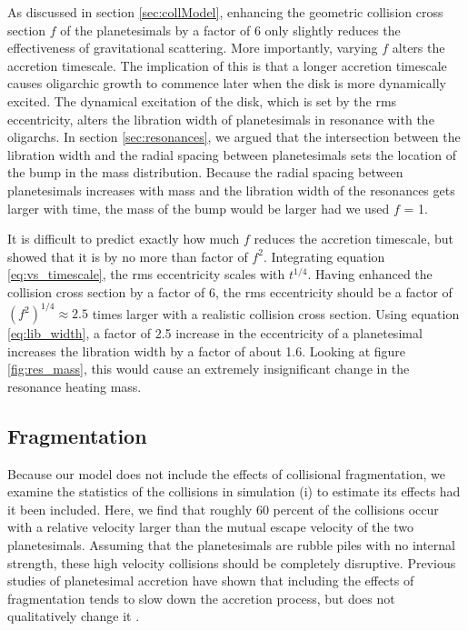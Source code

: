 As discussed in section \ref{sec:collModel}, enhancing the geometric collision cross section $f$ of the planetesimals by a factor 
of 6 only slightly reduces the effectiveness of gravitational scattering. More importantly, varying $f$ alters the accretion 
timescale. The implication of this is that a longer accretion timescale causes oligarchic growth to commence later when the disk 
is more dynamically excited. The dynamical excitation of the disk, which is set by the rms eccentricity, alters the libration width of 
planetesimals in resonance with the oligarchs. In section \ref{sec:resonances}, we argued that the intersection between the 
libration width and the radial spacing between planetesimals sets the location of the bump in the mass distribution. Because the 
radial spacing between planetesimals increases with mass and the libration width of the resonances gets larger with time, the 
mass of the bump would be larger had we used $f$ = 1.

It is difficult to predict exactly how much $f$ reduces the accretion timescale, but \cite{kokubo96} showed that it is by no more 
than factor of $f^2$. Integrating equation \ref{eq:vs_timescale}, the rms eccentricity scales with $t^{1/4}$. Having enhanced the 
collision cross section by a factor of 6, the rms eccentricity should be a factor of $(f^2)^{1/4} \approx 2.5$ times larger with a 
realistic collision cross section. Using equation \ref{eq:lib_width}, a factor of 2.5 increase in the eccentricity of a planetesimal 
increases the libration width by a factor of about 1.6. Looking at figure \ref{fig:res_mass}, this would cause an extremely 
insignificant change in the resonance heating mass.

\subsection{Fragmentation}

Because our model does not include the effects of collisional fragmentation, we examine the statistics of the collisions in 
simulation (i) to estimate its effects had it been included. Here, we find that roughly 60 percent of the collisions occur with a 
relative velocity larger than the mutual escape velocity of the two planetesimals. Assuming that the planetesimals are rubble 
piles with no internal strength, these high velocity collisions should be completely disruptive. Previous studies of planetesimal 
accretion have shown that including the effects of fragmentation tends to slow down the accretion process, but does not 
qualitatively change it \cite{wetherill93, leinhardt05}.

